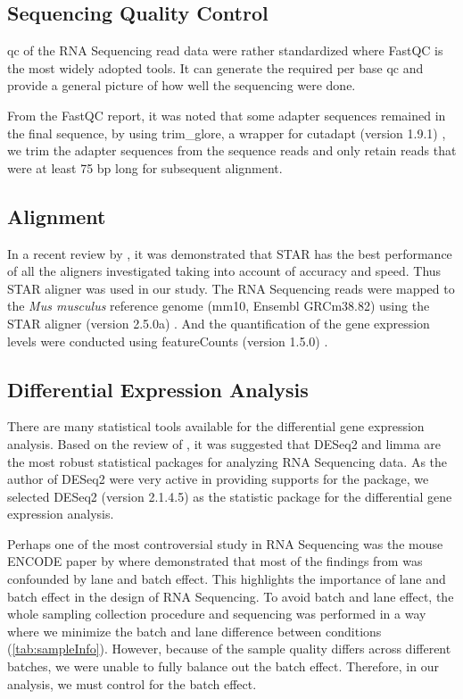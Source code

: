 \subsection{Sequencing Quality Control}
\Gls{qc} of the RNA Sequencing read data were rather standardized where FastQC \citep{Andrews2010} is the most widely adopted tools.
It can generate the required per base \gls{qc} and provide a general picture of how well the sequencing were done.

From the FastQC report, it was noted that some adapter sequences remained in the final sequence, by using trim\_glore, a wrapper for cutadapt (version 1.9.1) \citep{Martin2011}, we trim the adapter sequences from the sequence reads and only retain reads that were at least 75 \gls{bp} long for subsequent alignment. 

\subsection{Alignment}
In a recent review by \citet{Engstrom2013}, it was demonstrated that STAR \citep{Dobin2013} has the best performance of all the aligners investigated taking into account of accuracy and speed.
Thus STAR aligner was used in our study.
The RNA Sequencing reads were mapped to the \textit{Mus musculus} reference genome (mm10, Ensembl GRCm38.82) using the STAR aligner (version 2.5.0a) \citep{Dobin2013}.
And the quantification of the gene expression levels were conducted using featureCounts (version 1.5.0) \citep{Liao2014}.

\subsection{Differential Expression Analysis}
There are many statistical tools available for the differential gene expression analysis.
Based on the review of \citet{Seyednasrollah2015}, it was suggested that DESeq2 and limma are the most robust statistical packages for analyzing RNA Sequencing data. 
As the author of DESeq2 were very active in providing supports for the package, we selected DESeq2 (version 2.1.4.5) \citep{Love2014} as the statistic package for the differential gene expression analysis.

Perhaps one of the most controversial study in RNA Sequencing was the mouse ENCODE paper by \citet{Yue2014} where \citet{Gilad2015} demonstrated that most of the findings from \citet{Yue2014} was confounded by lane and batch effect.
This highlights the importance of lane and batch effect in the design of RNA Sequencing.
To avoid batch and lane effect, the whole sampling collection procedure and sequencing was performed in a way where we minimize the batch and lane difference between conditions (\cref{tab:sampleInfo}). 
However, because of the sample quality differs across different batches, we were unable to fully balance out the batch effect. 
Therefore, in our analysis, we must control for the batch effect.

